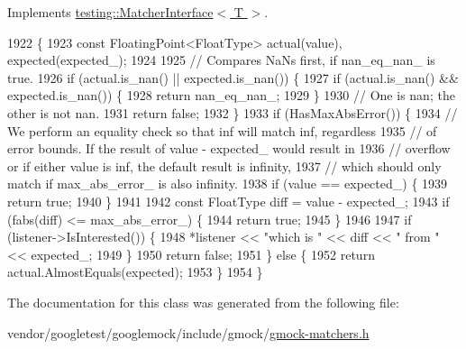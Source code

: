 Implements \hyperlink{classtesting_1_1MatcherInterface_a296b43607cd99d60365f0e6a762777cf}{testing\+::\+Matcher\+Interface$<$ T $>$}.


\begin{DoxyCode}
1922                                                                       \{
1923       \textcolor{keyword}{const} FloatingPoint<FloatType> actual(value), expected(expected\_);
1924 
1925       \textcolor{comment}{// Compares NaNs first, if nan\_eq\_nan\_ is true.}
1926       \textcolor{keywordflow}{if} (actual.is\_nan() || expected.is\_nan()) \{
1927         \textcolor{keywordflow}{if} (actual.is\_nan() && expected.is\_nan()) \{
1928           \textcolor{keywordflow}{return} nan\_eq\_nan\_;
1929         \}
1930         \textcolor{comment}{// One is nan; the other is not nan.}
1931         \textcolor{keywordflow}{return} \textcolor{keyword}{false};
1932       \}
1933       \textcolor{keywordflow}{if} (HasMaxAbsError()) \{
1934         \textcolor{comment}{// We perform an equality check so that inf will match inf, regardless}
1935         \textcolor{comment}{// of error bounds.  If the result of value - expected\_ would result in}
1936         \textcolor{comment}{// overflow or if either value is inf, the default result is infinity,}
1937         \textcolor{comment}{// which should only match if max\_abs\_error\_ is also infinity.}
1938         \textcolor{keywordflow}{if} (value == expected\_) \{
1939           \textcolor{keywordflow}{return} \textcolor{keyword}{true};
1940         \}
1941 
1942         \textcolor{keyword}{const} FloatType diff = value - expected\_;
1943         \textcolor{keywordflow}{if} (fabs(diff) <= max\_abs\_error\_) \{
1944           \textcolor{keywordflow}{return} \textcolor{keyword}{true};
1945         \}
1946 
1947         \textcolor{keywordflow}{if} (listener->IsInterested()) \{
1948           *listener << \textcolor{stringliteral}{"which is "} << diff << \textcolor{stringliteral}{" from "} << expected\_;
1949         \}
1950         \textcolor{keywordflow}{return} \textcolor{keyword}{false};
1951       \} \textcolor{keywordflow}{else} \{
1952         \textcolor{keywordflow}{return} actual.AlmostEquals(expected);
1953       \}
1954     \}
\end{DoxyCode}


The documentation for this class was generated from the following file\+:\begin{DoxyCompactItemize}
\item 
vendor/googletest/googlemock/include/gmock/\hyperlink{gmock-matchers_8h}{gmock-\/matchers.\+h}\end{DoxyCompactItemize}
